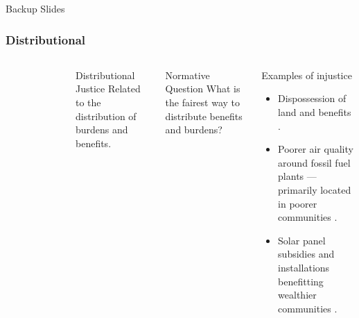 \begin{frame}
    Backup Slides
\end{frame}



\begin{frame}
    \frametitle{Distributional}
    \begin{columns}
        \column[t]{3cm}
        \begin{figure}
            \centering
        \end{figure}
        \column[t]{7cm}
        \begin{block}{Distributional Justice}
            Related to the distribution of burdens and benefits.
        \end{block}
        \begin{block}{Normative Question}
            What is the fairest way to distribute benefits and burdens?
        \end{block}
        \begin{block}{Examples of injustice}
            \begin{itemize}
                \item Dispossession of land and benefits
                \cite{yenneti_spatial_2016,sovacool_dispossessed_2021}. 
                \item Poorer air quality around fossil fuel plants --- primarily
                located in poorer communities \cite{mohai_which_2015}.
                \item Solar panel subsidies and installations benefitting
                wealthier communities \cite{reames_distributional_2020}.
            \end{itemize}
        \end{block}
    \end{columns}
    
\end{frame}

